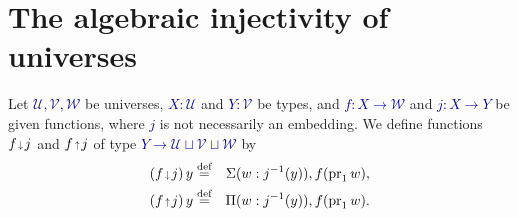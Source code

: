 \documentclass[10pt]{article}
\newcommand{\db}{\textcolor{darkblue}}
\newcommand{\m}[1]{\db{$#1$}}
\newcommand{\fst}{\operatorname{pr}_1}
\newcommand{\U}{\mathcal{U}}
\newcommand{\V}{\mathcal{V}}
\newcommand{\W}{\mathcal{W}}
\newcommand{\eqdef}{\overset{\text{def}}{=}}
\newcommand{\edown}{\scaleobj{0.7}{\,\downarrow\,}}
\newcommand{\eup}{\scaleobj{0.7}{\,\uparrow\,}}
\newtheorem{numbered}{}
\theoremstyle{definition}
\newtheorem{definition}[numbered]{Definition}
\begin{document}
\section{The algebraic injectivity of universes}

Let \m{\U,\V,\W} be universes, \m{X:\U} and \m{Y : \V} be types, and
\m{f : X \to \W} and \m{j : X \to Y} be given functions, where \m{j} is not necessarily an embedding.
  We define functions \m{f \edown j} and \m{f \eup j} of type \m{Y \to \U \sqcup \V \sqcup \W}
  by
  \db{\begin{eqnarray*}
    (f \edown j) \, y & \eqdef & \Sigma (w : j^{-1}(y)), f(\fst w), \\
    (f \eup j) \, y & \eqdef & \Pi (w : j^{-1}(y)), f(\fst w).
  \end{eqnarray*}}
\end{document}
